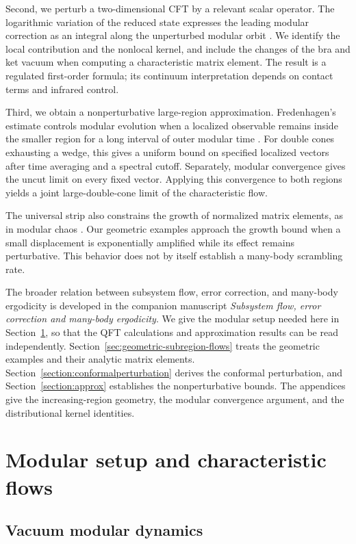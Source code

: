 \documentclass[a4paper,11pt]{article}
\theoremstyle{definition}
\begin{document}
Second, we perturb a two-dimensional CFT by a relevant scalar operator. The
logarithmic variation of the reduced state expresses the leading modular correction
as an integral along the unperturbed modular orbit
\cite{BalakrishnanParrikar2020}. We identify the local contribution and the
nonlocal kernel, and include the changes of the bra and ket vacuum when computing
a characteristic matrix element. The result is a regulated first-order formula;
its continuum interpretation depends on contact terms and infrared control.

Third, we obtain a nonperturbative large-region approximation. Fredenhagen's
estimate controls modular evolution when a localized observable remains inside
the smaller region for a long interval of outer modular time \cite{fredenhagen}.
For double cones exhausting a wedge, this gives a uniform bound on specified
localized vectors after time averaging and a spectral cutoff. Separately, modular
convergence gives the uncut limit on every fixed vector. Applying this convergence
to both regions yields a joint large-double-cone limit of the characteristic flow.

The universal strip also constrains the growth of normalized matrix elements,
as in modular chaos \cite{deBoerLamprou2020}. Our geometric examples approach the
growth bound when a small displacement is exponentially amplified while its
effect remains perturbative. This behavior does not by itself establish a
many-body scrambling rate.

The broader relation between subsystem flow, error correction, and many-body
ergodicity is developed in the companion manuscript
\emph{Subsystem flow, error correction and many-body ergodicity}. We give the
modular setup needed here in Section~\ref{sec:qft-setup}, so that the QFT
calculations and approximation results can be read independently.
Section~\ref{sec:geometric-subregion-flows} treats the geometric examples and
their analytic matrix elements. Section~\ref{section:conformalperturbation}
derives the conformal perturbation, and Section~\ref{section:approx} establishes
the nonperturbative bounds. The appendices give the increasing-region geometry,
the modular convergence argument, and the distributional kernel identities.

\section{Modular setup and characteristic flows}\label{sec:qft-setup}

\subsection{Vacuum modular dynamics}
\end{document}
